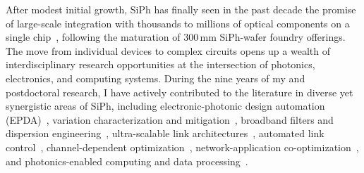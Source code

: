 After modest initial growth, SiPh has finally seen in the past decade the promise of large-scale integration with thousands to millions of optical components on a single chip~\cite{shekharRoadmappingNextGeneration2024}, following the maturation of 300\,mm SiPh-wafer foundry offerings. The move from individual devices to complex circuits opens up a wealth of interdisciplinary research opportunities at the intersection of photonics, electronics, and computing systems. During the nine years of my \myDegree{} and postdoctoral research, I have actively contributed to the literature in diverse yet synergistic areas of SiPh, including electronic-photonic design automation (EPDA)~\cite{wuCompactModelingCircuitlevel2017,zhangCompactModelingSilicon2017,jamesFlexibleProcessAwareCompact2022,jamesProcessVariationAwareCompact2023a}, variation characterization and mitigation~\cite{wuPairingMicroringbasedSilicon2018,wangEnergyefficientChannelAlignment2018,wangTamingEmergingDevices2019,wangBidirectionalTuningMicroringbased2019,wangCharacterizationApplicationsSpatial2020,wangEnergyEfficiencyYield2021}, broadband filters and dispersion engineering~\cite{wangDispersionEngineeredFabricationRobustSOI2023,wangIntegratedCompactTunable2023,parsonsOFC25}, ultra-scalable link architectures~\cite{wangScalableArchitectureSubpJ2023,novickHighbandwidthDensitySilicon2023}, automated link control~\cite{wangAutomatedTuningRingAssisted2024,wangInterleaverTuning,wangOFC25}, channel-dependent optimization~\cite{novickIntegratedPhotonicResonant2024,gopalEqualization2024}, network-application co-optimization~\cite{wangTaskMappingAssistedLaser2019,wangTrafficAdaptivePowerReconfiguration2021,michelogiannakisEfficientIntraRackResource2023,wuWavelengthReconfigurableTransceiver2024,wuFlexibleSiliconPhotonic2024}, and photonics-enabled computing and data processing~\cite{naumanOFC25,zypmanDSP}.

